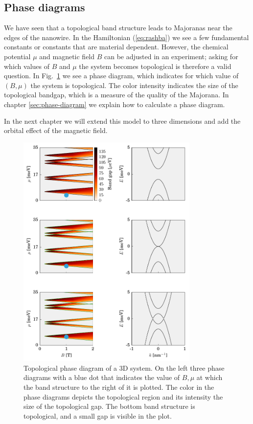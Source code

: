 \subsection{Phase diagrams}

We have seen that a topological band structure leads to Majoranas near the edges of the nanowire.
In the Hamiltonian (\ref{eq:rashba}) we see a few fundamental constants or constants that are material dependent.
However, the chemical potential $\mu$ and magnetic field $B$ can be adjusted in an experiment; asking for which values of $B$ and $\mu$ the system becomes topological is therefore a valid question.
In Fig.~\ref{fig:topo_bands} we see a phase diagram, which indicates for which value of $\left(B,\mu\right)$ the system is topological.
The color intensity indicates the size of the topological bandgap, which is a measure of the quality of the Majorana.
In chapter \ref{sec:phase-diagram} we explain how to calculate a phase diagram.

In the next chapter we will extend this model to three dimensions and add the orbital effect of the magnetic field.

\begin{figure}
\begin{centering}
\includegraphics[width=0.8\textwidth]{chapter_introduction/figures/phase_diagrams_bands.pdf}
\par\end{centering}
\caption{Topological phase diagram of a 3D system.
On the left three phase diagrams with a blue dot that indicates the value of $B,\mu$ at which the band structure to the right of it is plotted.
The color in the phase diagrams depicts the topological region and its intensity the size of the topological gap.
The bottom band structure is topological, and a small gap is visible in the plot.
\label{fig:topo_bands}}
\end{figure}


